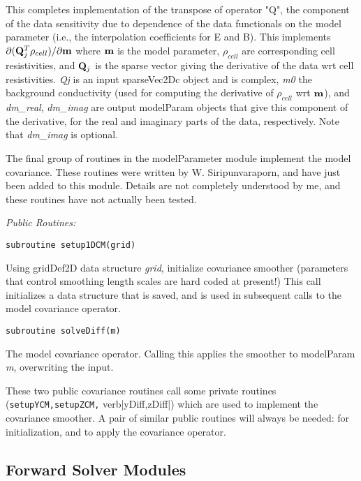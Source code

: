 \documentclass[12pt]{article}
\begin{document}
This completes implementation of the transpose of operator "Q", the component
of the data sensitivity due to dependence of the data functionals on the 
model parameter (i.e., the interpolation coefficients for E and B).
This implements $\partial ({\bf Q}_j^T \rho_{cell})/\partial{\bf m}$
where $\bf m$ is the model parameter, $\rho_{cell}$ are 
corresponding cell resistivities, and ${\bf Q}_j$ is the sparse
vector giving the derivative of the data wrt cell resistivities.
{\it Qj} is an input sparseVec2Dc object and is complex,
{\it m0} the background conductivity (used for computing the
derivative of $\rho_{cell}$ wrt $\bf m$), and {\it dm\_real}, {\it dm\_imag}
are output modelParam objects that give this component of the
derivative, for the real and imaginary parts of the data, respectively.
Note that {\it dm\_imag} is optional.

The final group of routines in the modelParameter module implement
the model covariance.  These routines were written by W. Siripunvaraporn,
and have just been added to this module.  Details are not completely
understood by me, and these routines have not actually been tested.

\vspace{10pt}
\noindent
{\it Public Routines:}

\begin{verbatim}
subroutine setup1DCM(grid)
\end{verbatim}

Using gridDef2D data structure {\it grid}, initialize covariance smoother 
(parameters that control smoothing length scales are hard coded at present!)
This call initializes a data structure that is saved, and is used
in subsequent calls to the model covariance operator.

\begin{verbatim}
subroutine solveDiff(m)
\end{verbatim}

The model covariance operator.  Calling this 
applies the smoother to modelParam {\it m}, overwriting the input.

\vspace{6pt}

These two public covariance routines call some private routines
(\verb|setupYCM,setupZCM,| verb|yDiff,zDiff|) 
which are used to implement the
covariance smoother.  A pair of similar public routines will
always be needed: for initialization, and to apply the covariance operator.

\subsection{Forward Solver Modules}
\end{document}

